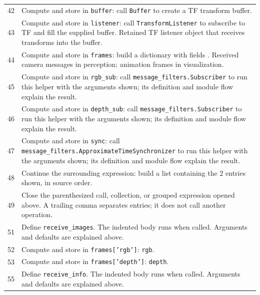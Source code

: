 \documentclass[11pt,a4paper]{book}
\begin{document}
\begin{longtable}{r p{}}
42 & Compute and store in \texttt{buffer}: call \texttt{Buffer} to create a TF transform buffer.  \\

43 & Compute and store in \texttt{listener}: call \texttt{TransformListener} to subscribe to TF and fill the supplied buffer. Retained TF listener object that receives transforms into the buffer. \\

44 & Compute and store in \texttt{frames}: build a dictionary with fields \texttt{}. Received camera messages in perception; animation frames in visualization. \\

45 & Compute and store in \texttt{rgb\_sub}: call \texttt{message\_filters.Subscriber} to run this helper with the arguments shown; its definition and module flow explain the result.  \\

46 & Compute and store in \texttt{depth\_sub}: call \texttt{message\_filters.Subscriber} to run this helper with the arguments shown; its definition and module flow explain the result.  \\

47 & Compute and store in \texttt{sync}: call \texttt{message\_filters.ApproximateTimeSynchronizer} to run this helper with the arguments shown; its definition and module flow explain the result.  \\

48 & Continue the surrounding expression: build a list containing the 2 entries shown, in source order. \\

49 & Close the parenthesized call, collection, or grouped expression opened above. A trailing comma separates entries; it does not call another operation. \\

51 & Define \texttt{receive\_images}. The indented body runs when called. Arguments and defaults are explained above. \\

52 & Compute and store in \texttt{frames['rgb']}: \texttt{rgb}.  \\

53 & Compute and store in \texttt{frames['depth']}: \texttt{depth}.  \\

55 & Define \texttt{receive\_info}. The indented body runs when called. Arguments and defaults are explained above. \\


\end{longtable}
\end{document}
